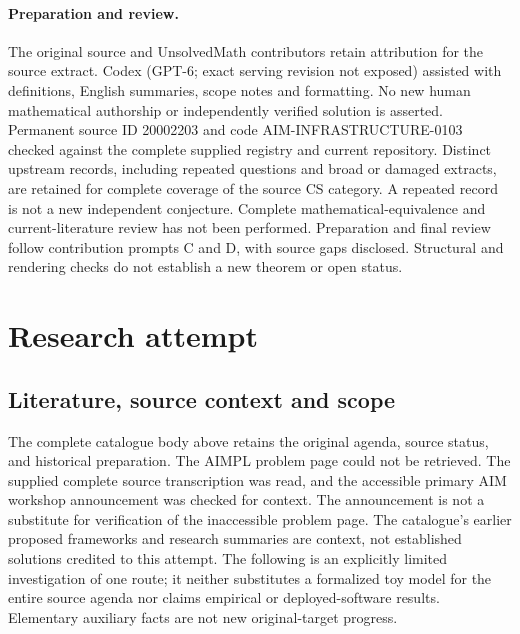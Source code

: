\documentclass[11pt]{article}
\begin{document}
\paragraph{Preparation and review.}
The original source and UnsolvedMath contributors retain attribution for the source extract. Codex (GPT-6; exact serving revision not exposed) assisted with definitions, English summaries, scope notes and formatting. No new human mathematical authorship or independently verified solution is asserted. Permanent source ID 20002203 and code AIM-INFRASTRUCTURE-0103 checked against the complete supplied registry and current repository. Distinct upstream records, including repeated questions and broad or damaged extracts, are retained for complete coverage of the source CS category. A repeated record is not a new independent conjecture. Complete mathematical-equivalence and current-literature review has not been performed. Preparation and final review follow contribution prompts C and D, with source gaps disclosed. Structural and rendering checks do not establish a new theorem or open status.
\label{end:20002203}

\section{Research attempt}
\subsection{Literature, source context and scope}
The complete catalogue body above retains the original agenda, source status, and historical preparation. The AIMPL problem page could not be retrieved. The supplied complete source transcription was read, and the accessible primary AIM workshop announcement was checked for context. The announcement is not a substitute for verification of the inaccessible problem page. The catalogue's earlier proposed frameworks and research summaries are context, not established solutions credited to this attempt. The following is an explicitly limited investigation of one route; it neither substitutes a formalized toy model for the entire source agenda nor claims empirical or deployed-software results. Elementary auxiliary facts are not new original-target progress.
\end{document}
